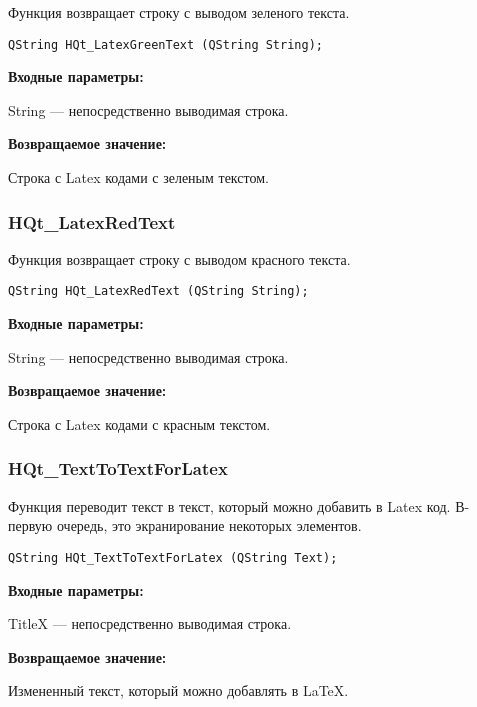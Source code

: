 \documentclass[a4paper,12pt]{article}
\begin{document}
Функция возвращает строку с выводом зеленого текста.


\begin{lstlisting}[label=code_syntax_HQt_LatexGreenText,caption=Синтаксис]
QString HQt_LatexGreenText (QString String);
\end{lstlisting}

\textbf{Входные параметры:}

String --- непосредственно выводимая строка.

\textbf{Возвращаемое значение:}

Строка с Latex кодами с зеленым текстом.


\subsubsection{HQt\_LatexRedText}\label{HQt_LatexRedText}

Функция возвращает строку с выводом красного текста.


\begin{lstlisting}[label=code_syntax_HQt_LatexRedText,caption=Синтаксис]
QString HQt_LatexRedText (QString String);
\end{lstlisting}

\textbf{Входные параметры:}

String --- непосредственно выводимая строка.

\textbf{Возвращаемое значение:}

Строка с Latex кодами с красным текстом.


\subsubsection{HQt\_TextToTextForLatex}\label{HQt_TextToTextForLatex}

Функция переводит текст в текст, который можно добавить в Latex код. В-первую очередь, это экранирование некоторых элементов.


\begin{lstlisting}[label=code_syntax_HQt_TextToTextForLatex,caption=Синтаксис]
QString HQt_TextToTextForLatex (QString Text);
\end{lstlisting}

\textbf{Входные параметры:}

TitleX --- непосредственно выводимая строка.

\textbf{Возвращаемое значение:}

Измененный текст, который можно добавлять в LaTeX.
\end{document}
